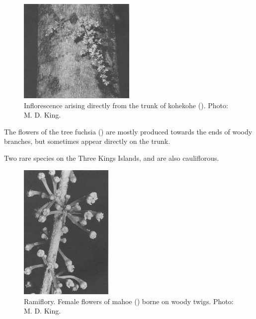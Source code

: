 \begin{figure}
	\includegraphics[width=0.5\textwidth]{graphics/figure16infloresence.jpg}
	\centering
	\caption[Inflorescence arising directly from the trunk of kohekohe]{Inflorescence arising directly from the trunk of kohekohe ().
    Photo:  M. D. King.}
	\label{fig:16infloresence}
\end{figure}

The flowers of the tree fuchsia () are mostly produced towards the ends of woody branches, but sometimes appear directly on the trunk.

Two rare species on the Three Kings Islands,  and  are also cauliflorous.

\begin{figure}
	\includegraphics[width=0.4\textwidth]{graphics/figure17mahoe.jpg}
	\centering
	\caption[Ramiflory.
    Female flowers of mahoe]{Ramiflory.
    Female flowers of mahoe () borne on woody twigs.
    Photo:  M. D. King.}
	\label{fig:17mahoe}
\end{figure}

